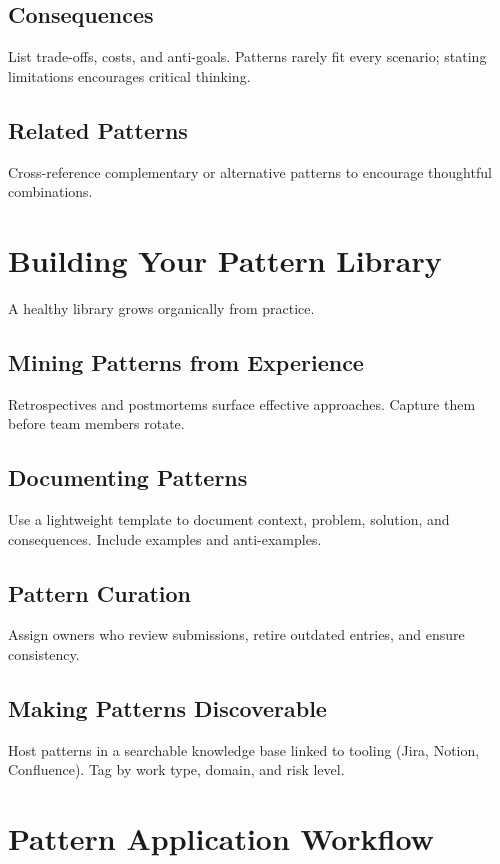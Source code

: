 \subsection{Consequences}
List trade-offs, costs, and anti-goals. Patterns rarely fit every scenario; stating limitations encourages critical thinking.

\subsection{Related Patterns}
Cross-reference complementary or alternative patterns to encourage thoughtful combinations.

\section{Building Your Pattern Library}
\label{sec:pattern-library}

A healthy library grows organically from practice.

\subsection{Mining Patterns from Experience}
Retrospectives and postmortems surface effective approaches. Capture them before team members rotate.

\subsection{Documenting Patterns}
Use a lightweight template to document context, problem, solution, and consequences. Include examples and anti-examples.

\subsection{Pattern Curation}
Assign owners who review submissions, retire outdated entries, and ensure consistency.

\subsection{Making Patterns Discoverable}
Host patterns in a searchable knowledge base linked to tooling (Jira, Notion, Confluence). Tag by work type, domain, and risk level.

\section{Pattern Application Workflow}
\label{sec:pattern-workflow}

